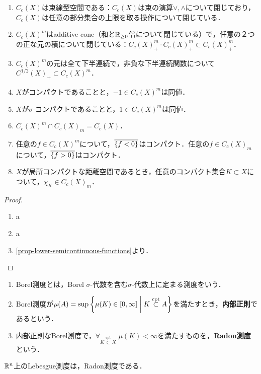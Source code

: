 \documentclass[uplatex,dvipdfmx]{jsreport}
\begin{document}
\begin{lemma}[Riesz空間]\mbox{}
    \begin{enumerate}
        \item $C_c(X)$は束線型空間である：$C_c(X)$は束の演算$\lor,\land$について閉じており，$C_c(X)$は任意の部分集合の上限を取る操作について閉じている．
        \item $C_c(X)^m$はadditive cone（和と$\mathbb{R}_{\ge 0}$倍について閉じている）で，任意の２つの正な元の積について閉じている：$C_c(X)^m_+\cdot C_c(X)^m_+\subset C_c(X)^m_+$．
        \item $C_c(X)^m$の元は全て下半連続で，非負な下半連続関数について$C^{1/2}(X)_+\subset C_c(X)^m$．
        \item $X$がコンパクトであることと，$-1\in C_c(X)^m$は同値．
        \item $X$が$\sigma$-コンパクトであることと，$1\in C_c(X)^m$は同値．
        \item $C_c(X)^m\cap C_c(X)_m=C_c(X)$．
        \item 任意の$f\in C_c(X)^m$について，$\overline{\left\{f<0\right\}}$はコンパクト．任意の$f\in C_c(X)_m$について，$\overline{\left\{f>0\right\}}$はコンパクト．
        \item $X$が局所コンパクトな距離空間であるとき，任意のコンパクト集合$K\subset X$について，$\chi_K\in C_c(X)_m$．
    \end{enumerate}
\end{lemma}
\begin{proof}\mbox{}
    \begin{enumerate}
        \item a
        \item a
        \item \ref{prop-lower-semicontinuous-functions}より．
    \end{enumerate}
\end{proof}


\begin{definition}\mbox{}
    \begin{enumerate}
        \item Borel測度とは，Borel $\sigma$-代数を含む$\sigma$-代数上に定まる測度をいう．
        \item Borel測度が$\mu(A)=\sup\left\{\mu(K)\in[0,\infty]\;\middle|\; K\overset{\mathrm{cpt}}{\subset}A\right\}$を満たすとき，\textbf{内部正則}であるという．
        \item 内部正則なBorel測度で，$\forall_{K\overset{\mathrm{cpt}}{\subset}X}\;\mu(K)<\infty$を満たすものを，\textbf{Radon測度}という．
    \end{enumerate}
\end{definition}
\begin{example}
    $\mathbb{R}^n$上のLebesgue測度は，Radon測度である．
\end{example}
\end{document}

